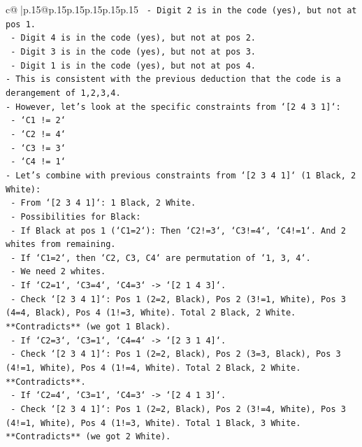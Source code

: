 \documentclass{article}
\begin{document}
{\begin{supertabular}{c@{$\;$}|p{.15\linewidth}@{}p{.15\linewidth}p{.15\linewidth}p{.15\linewidth}p{.15\linewidth}p{.15\linewidth}}
{{{\texttt{  {-} Digit 2 is in the code (yes), but not at pos 1.} \\
\texttt{  {-} Digit 4 is in the code (yes), but not at pos 2.} \\
\texttt{  {-} Digit 3 is in the code (yes), but not at pos 3.} \\
\texttt{  {-} Digit 1 is in the code (yes), but not at pos 4.} \\
\texttt{{-} This is consistent with the previous deduction that the code is a derangement of 1,2,3,4.} \\
\texttt{{-} However, let's look at the specific constraints from `{[}2 4 3 1{]}`:} \\
\texttt{  {-} `C1 != 2`} \\
\texttt{  {-} `C2 != 4`} \\
\texttt{  {-} `C3 != 3`} \\
\texttt{  {-} `C4 != 1`} \\
\texttt{{-} Let's combine with previous constraints from `{[}2 3 4 1{]}` (1 Black, 2 White):} \\
\texttt{  {-} From `{[}2 3 4 1{]}`: 1 Black, 2 White.} \\
\texttt{  {-} Possibilities for Black:} \\
\texttt{    {-} If Black at pos 1 (`C1=2`): Then `C2!=3`, `C3!=4`, `C4!=1`. And 2 whites from remaining.} \\
\texttt{      {-} If `C1=2`, then `C2, C3, C4` are permutation of `1, 3, 4`.} \\
\texttt{      {-} We need 2 whites.} \\
\texttt{      {-} If `C2=1`, `C3=4`, `C4=3` {-}> `{[}2 1 4 3{]}`.} \\
\texttt{        {-} Check `{[}2 3 4 1{]}`: Pos 1 (2=2, Black), Pos 2 (3!=1, White), Pos 3 (4=4, Black), Pos 4 (1!=3, White). Total 2 Black, 2 White. **Contradicts** (we got 1 Black).} \\
\texttt{      {-} If `C2=3`, `C3=1`, `C4=4` {-}> `{[}2 3 1 4{]}`.} \\
\texttt{        {-} Check `{[}2 3 4 1{]}`: Pos 1 (2=2, Black), Pos 2 (3=3, Black), Pos 3 (4!=1, White), Pos 4 (1!=4, White). Total 2 Black, 2 White. **Contradicts**.} \\
\texttt{      {-} If `C2=4`, `C3=1`, `C4=3` {-}> `{[}2 4 1 3{]}`.} \\
\texttt{        {-} Check `{[}2 3 4 1{]}`: Pos 1 (2=2, Black), Pos 2 (3!=4, White), Pos 3 (4!=1, White), Pos 4 (1!=3, White). Total 1 Black, 3 White. **Contradicts** (we got 2 White).} \\
}}}
\end{supertabular}}
\end{document}
